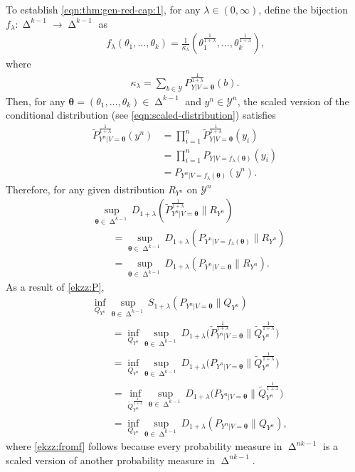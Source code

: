 \documentclass[journal, 10pt]{IEEEtran}
\newcommand{\cY}{\mathcal{Y}}
\theoremstyle{plain}
\theoremstyle{plain}
\theoremstyle{plain}
\theoremstyle{plain}
\newcommand{\boldtheta}{\mathbold{\theta}}
\newcommand{\simplex}{\operatorname{\Delta}}
\begin{document}
To establish \eqref{eqn:thm:gen-red-cap:1}, for any $\lambda \in (0, \infty) $, define the bijection $f_\lambda \colon \simplex^{k-1}\to \simplex^{k-1}$ as
\begin{align}
f_\lambda(\theta_1, \hdots, \theta_k)=\frac1{\kappa_\lambda}\left( \theta_1^{\frac{1}{1+\lambda}}, \hdots, \theta_k^{\frac{1}{1+\lambda}} \right)\text{,}
\end{align}
where
\begin{align}
	\kappa_\lambda=\sum_{b\in \cY}P_{Y|V=\boldtheta}^\frac{1}{1+\lambda}(b)\text{.}
\end{align}
Then, for any $\boldtheta=(\theta_1, \hdots, \theta_k) \in \simplex^{k-1} $ and $y^n \in \cY^n $, the scaled version of the conditional distribution (see \eqref{eqn:scaled-distribution}) satisfies
\begin{align}
\widetilde{P}_{Y^n|V=\boldtheta}^{\frac{1}{1+\lambda}}(y^n)
&=
\prod_{i=1}^{n}\widetilde{P}_{Y|V=\boldtheta}^{\frac{1}{1+\lambda}}(y_i)\\
&=\prod_{i=1}^{n}P_{Y|V=f_\lambda(\boldtheta)}(y_i) \\
&=P_{Y^n|V=f_\lambda(\boldtheta)}(y^n)\text{.}
\end{align}
Therefore, for any given distribution $R_{Y^n}$ on $\cY^n$
\begin{align}
&\sup_{\boldtheta\in \simplex^{k-1}}D_{1+\lambda}(\widetilde{P}_{Y^n|V=\boldtheta}^{\frac{1}{1+\lambda}}\|R_{Y^n}) \nonumber \\
&\qquad =\sup_{\boldtheta\in \simplex^{k-1}}D_{1+\lambda}({P}_{Y^n|V= f_\lambda(\boldtheta)}\|R_{Y^n})  \\
&\qquad =\sup_{\boldtheta \in \simplex^{k-1}}D_{1+\lambda}({P}_{Y^n|V=\boldtheta}\|R_{Y^n})\text{.} \label{ekzz:P}
\end{align}
As a result of \eqref{ekzz:P},
\begin{align}
&\inf_{Q_{Y^n} }\sup_{\boldtheta\in \simplex^{k-1}} S_{1+\lambda}(P_{Y^n|V=\boldtheta}  \| Q_{Y^n}) \nonumber \\
&\qquad =
\inf_{Q_{Y^n} }\sup_{\boldtheta\in \simplex^{k-1}}D_{1+\lambda} \Big(\widetilde{P}_{Y^n|V=\boldtheta}^{\frac{1}{1+\lambda}}\|\widetilde{Q}_{Y^n}^{\frac{1}{1+\lambda}}\Big) \\ 
&\qquad = \inf_{Q_{Y^n} }\sup_{\boldtheta \in \simplex^{k-1}}D_{1+\lambda} \Big(P_{Y^n|V=\boldtheta} \| \widetilde{Q}_{Y^n}^{\frac{1}{1+\lambda}}\Big) \label{ekzz:from_P}\\
&\qquad =\inf_{\widetilde{Q}^{\frac{1}{1+\lambda}}_{Y^n} }\sup_{\boldtheta\in \simplex^{k-1}}D_{1+\lambda} \Big(P_{Y^n|V=\boldtheta} \| \widetilde{Q}_{Y^n}^{\frac{1}{1+\lambda}}\Big)\label{ekzz:fromf}\\
&\qquad = \inf_{Q_{Y^n} }\sup_{\boldtheta\in \simplex^{k-1}}D_{1+\lambda}\left(P_{Y^n|V=\boldtheta}\|Q_{Y^n}\right)\text{,} \label{ekzz:dumm}
\end{align}
where \eqref{ekzz:fromf} follows because every probability measure in $\simplex^{nk-1} $ is a scaled version of another probability measure in $\simplex^{nk-1} $.
\end{document}
